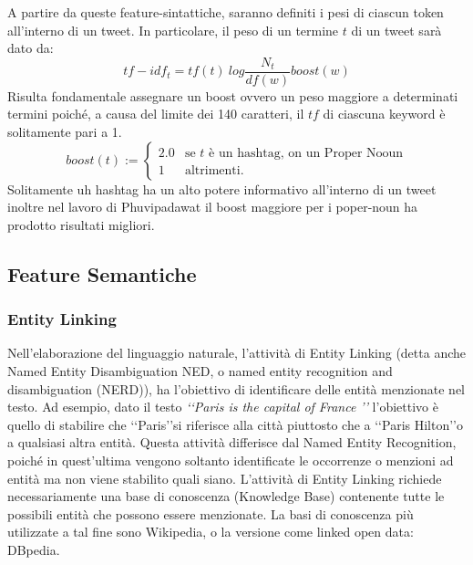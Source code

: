 A partire da queste feature-sintattiche, saranno definiti i pesi di ciascun token all'interno di un tweet.
In particolare, il peso di un termine $t$ di un tweet sarà dato da:
\begin{equation}
tf-idf_t=tf(t)\ log\frac{N_t}{df(w)}boost(w)
\end{equation}
 Risulta fondamentale assegnare un boost ovvero un peso maggiore a determinati termini poiché, a causa del limite dei 140 caratteri, il $tf$ di ciascuna keyword è solitamente pari a 1. 
\begin{equation*}
boost(t):=\begin{cases}
2.0 & \text{se $t$ è un hashtag, on un Proper Nooun}\\
1& \text{altrimenti.}
\end{cases}
\end{equation*}
Solitamente uh hashtag ha un alto potere informativo all'interno di un tweet inoltre nel lavoro di  Phuvipadawat \cite{Phuvipadawat:2010:BND:1913791.1913911}  il boost maggiore per i poper-noun ha prodotto risultati migliori.





\subsection{Feature Semantiche}
\subsubsection{Entity Linking} 
Nell'elaborazione del linguaggio naturale, l'attività di Entity Linking (detta anche Named Entity Disambiguation NED, o named entity recognition and disambiguation (NERD)), ha l'obiettivo di identificare delle entità menzionate nel testo. Ad esempio, dato il testo \emph{\lq\lq Paris is the capital of France \rq \rq} l'obiettivo è quello di stabilire che  \lq\lq Paris\rq\rq si riferisce alla città piuttosto che a \lq\lq Paris Hilton\rq\rq o a qualsiasi altra entità.
Questa attività differisce dal Named Entity Recognition, poiché in quest'ultima vengono soltanto identificate le occorrenze o menzioni ad entità ma non viene stabilito quali siano.
L'attività di Entity Linking richiede necessariamente una base di conoscenza (Knowledge Base) contenente tutte le possibili entità che possono essere menzionate. La basi di conoscenza più utilizzate a tal fine sono  Wikipedia, o la versione come linked open data: DBpedia.

